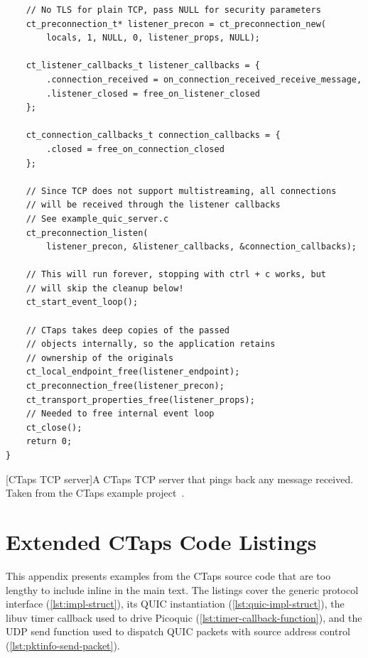 {\begin{verbatim}
    // No TLS for plain TCP, pass NULL for security parameters
    ct_preconnection_t* listener_precon = ct_preconnection_new(
        locals, 1, NULL, 0, listener_props, NULL);

    ct_listener_callbacks_t listener_callbacks = {
        .connection_received = on_connection_received_receive_message,
        .listener_closed = free_on_listener_closed
    };

    ct_connection_callbacks_t connection_callbacks = {
        .closed = free_on_connection_closed
    };

    // Since TCP does not support multistreaming, all connections
    // will be received through the listener callbacks
    // See example_quic_server.c
    ct_preconnection_listen(
        listener_precon, &listener_callbacks, &connection_callbacks);

    // This will run forever, stopping with ctrl + c works, but
    // will skip the cleanup below!
    ct_start_event_loop();

    // CTaps takes deep copies of the passed
    // objects internally, so the application retains
    // ownership of the originals
    ct_local_endpoint_free(listener_endpoint);
    ct_preconnection_free(listener_precon);
    ct_transport_properties_free(listener_props);
    // Needed to free internal event loop
    ct_close();
    return 0;
}
\end{verbatim}
[CTaps TCP server]{A CTaps TCP server
that pings back any message received.
Taken from the CTaps example project~\cite{ctaps-example-project}.
}
\label{lst:ctaps-tcp-ping-server}
}



\chapter{Extended CTaps Code Listings}\label{app:internal-code-examples}
This appendix presents examples from the CTaps source code that are 
too lengthy to include inline in the main text. The listings cover the generic 
protocol interface (\cref{lst:impl-struct}), its QUIC instantiation 
(\cref{lst:quic-impl-struct}), the libuv timer callback used to drive 
Picoquic (\cref{lst:timer-callback-function}), and the UDP send function 
used to dispatch QUIC packets with source address control 
(\cref{lst:pktinfo-send-packet}).

